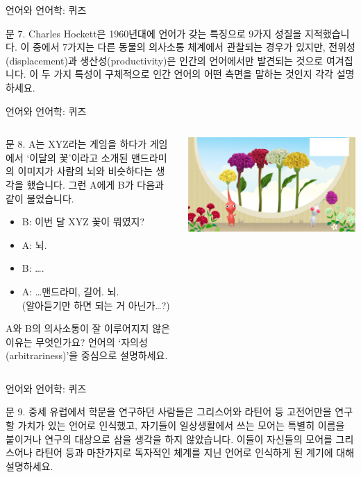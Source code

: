 \documentclass[11pt, aspectratio=169]{beamer}
\begin{document}
\begin{frame}[t]{언어와 언어학: 퀴즈}
  \begin{block}{문 7.}
    Charles Hockett은 1960년대에 언어가 갖는 특징으로 9가지 성질을 지적했습니다. 이 중에서 7가지는 다른 동물의 의사소통 체계에서 관찰되는 경우가 있지만, 전위성(displacement)과 생산성(productivity)은 인간의 언어에서만 발견되는 것으로 여겨집니다. 이 두 가지 특성이 구체적으로 인간 언어의 어떤 측면을 말하는 것인지 각각 설명하세요. 
  \end{block}
\end{frame}

\begin{frame}[t]{언어와 언어학: 퀴즈}
  \begin{columns}
    \begin{column}{0.6\textwidth}
      \begin{block}{문 8.}
        A는 XYZ라는 게임을 하다가 게임에서 ‘이달의 꽃’이라고 소개된 맨드라미의 이미지가 사람의 뇌와 비슷하다는 생각을 했습니다. 그런 A에게 B가 다음과 같이 물었습니다.
        \begin{itemize}
          \item B: 이번 달 XYZ 꽃이 뭐였지?
          \item A: 뇌.
          \item B: ….
          \item A: …맨드라미, 길어. 뇌. \\ (알아듣기만 하면 되는 거 아닌가…?)
        \end{itemize}
        A와 B의 의사소통이 잘 이루어지지 않은 이유는 무엇인가요? 언어의 ‘자의성(arbitrariness)’을 중심으로 설명하세요.
      \end{block}      
    \end{column}
    \begin{column}{0.33\textwidth}
      \includegraphics[width=1.5\textwidth]{img/IMG_8059.png}      
    \end{column}
  \end{columns}
\end{frame}

\begin{frame}[t]{언어와 언어학: 퀴즈}
  \begin{block}{문 9.}
    중세 유럽에서 학문을 연구하던 사람들은 그리스어와 라틴어 등 고전어만을 연구할 가치가 있는 언어로 인식했고, 자기들이 일상생활에서 쓰는 모어는 특별히 이름을 붙이거나 연구의 대상으로 삼을 생각을 하지 않았습니다. 이들이 자신들의 모어를 그리스어나 라틴어 등과 마찬가지로 독자적인 체계를 지닌 언어로 인식하게 된 계기에 대해 설명하세요. 
  \end{block}
\end{frame}
\end{document}
